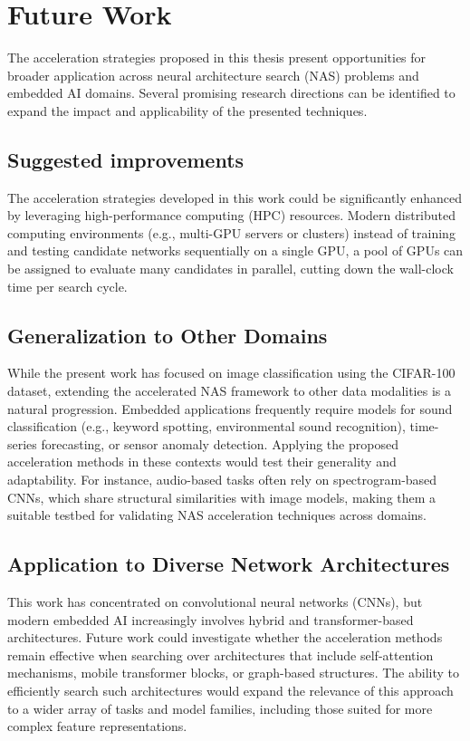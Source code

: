 \chapter{Future Work}

The acceleration strategies proposed in this thesis present opportunities for broader application across neural architecture search (NAS) problems and embedded AI domains. Several promising research directions can be identified to expand the impact and applicability of the presented techniques.

\section{Suggested improvements}

The acceleration strategies developed in this work could be significantly enhanced by leveraging high-performance computing (HPC) resources. Modern distributed computing environments (e.g., multi-GPU servers or clusters) instead of training and testing candidate networks sequentially on a single GPU, a pool of GPUs can be assigned to evaluate many candidates in parallel, cutting down the wall-clock time per search cycle.


\section{Generalization to Other Domains}

While the present work has focused on image classification using the CIFAR-100 dataset, extending the accelerated NAS framework to other data modalities is a natural progression. Embedded applications frequently require models for sound classification (e.g., keyword spotting, environmental sound recognition), time-series forecasting, or sensor anomaly detection. Applying the proposed acceleration methods in these contexts would test their generality and adaptability. For instance, audio-based tasks often rely on spectrogram-based CNNs, which share structural similarities with image models, making them a suitable testbed for validating NAS acceleration techniques across domains.

\section{Application to Diverse Network Architectures}

This work has concentrated on convolutional neural networks (CNNs), but modern embedded AI increasingly involves hybrid and transformer-based architectures. Future work could investigate whether the acceleration methods remain effective when searching over architectures that include self-attention mechanisms, mobile transformer blocks, or graph-based structures. The ability to efficiently search such architectures would expand the relevance of this approach to a wider array of tasks and model families, including those suited for more complex feature representations.

